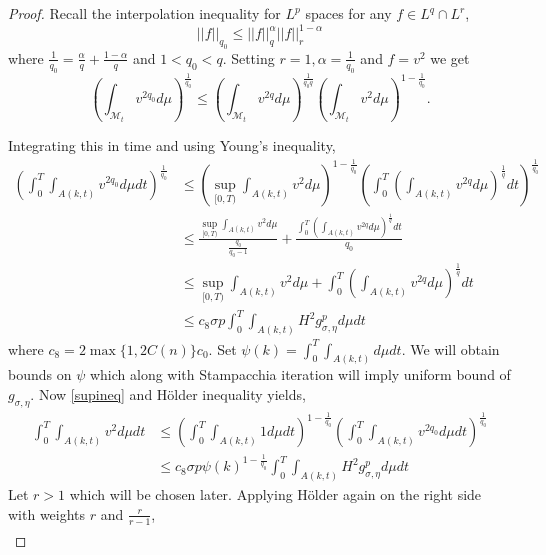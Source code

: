 \begin{proof}
        Recall the interpolation inequality for $ L^{p} $ spaces for any $ f \in L^{q} \cap L^{r} $,
        \[ ||f||_{q_{0}} \le ||f||_{q}^{\alpha}||f||_{r}^{1-\alpha} \]
        where $ \frac{1}{q_{0}} = \frac{\alpha}{q}+ \frac{1-\alpha}{q} $ and $ 1<q_{0}<q $. Setting $ r=1, \alpha = \frac{1}{q_{0}}$ and $ f=v^{2} $ we get \begin{equation}
            \left( \int_{\mathcal{M}_{t}}v^{2q_{0}} d \mu \right)^{\frac{1}{q_{0}}} \le \left( \int_{\mathcal{M}_{t}}v^{2q}d \mu \right)^{\frac{1}{q_{0}q}} \left( \int_{\mathcal{M}_{t}}v^{2}d \mu \right)^{1-\frac{1}{q_{0}}}.
        \end{equation}

        Integrating this in time and using Young's inequality, \begin{align*}
            \left( \int_{0}^{T}\int_{A(k,t)}v^{2q_{0}}d \mu dt \right)^{\frac{1}{q_{0}}} &\le \left( \sup_{[0,T)}\int_{A(k,t)}v^{2}d \mu  \right)^{1-\frac{1}{q_{0}}}\left( \int_{0}^{T}\left( \int_{A(k,t)}v^{2q}d \mu \right)^{\frac{1}{q}} dt\right)^{\frac{1}{q_{0}}} \\
            & \le \frac{ \sup_{[0,T)}\int_{A(k,t)}v^{2}d \mu}{\frac{q_{0}}{q_{0}-1}}+ \frac{\int_{0}^{T}\left( \int_{A(k,t)}v^{2q}d \mu \right)^{\frac{1}{q}} dt}{q_{0}} \\
            & \le  \sup_{[0,T)}\int_{A(k,t)}v^{2}d \mu+ \int_{0}^{T}\left( \int_{A(k,t)}v^{2q}d \mu \right)^{\frac{1}{q}} dt \\
            & \le c_{8} \sigma p \int_{0}^{T}\int_{A(k,t)}H^{2}g_{\sigma,\eta}^{p}d \mu dt
        \end{align*}
        where $ c_{8} =  2\max\{1,2C(n)\}c_{0}$. Set $ \psi(k) = \int_{0}^{T} \int_{A(k,t)}d \mu dt $. We will obtain bounds on $ \psi $ which along with Stampacchia iteration will imply uniform bound of $ g_{\sigma,\eta} $.  Now \cref{supineq} and H\"{o}lder inequality yields, \begin{align}
            \int_{0}^{T}\int_{A(k,t)}v^{2}d \mu dt & \le \left( \int_{0}^{T}\int_{A(k,t)}1 d \mu dt\right)^{1-\frac{1}{q_{0}}} \left( \int_{0}^{T}\int_{A(k,t)}v^{2q_{0}}d \mu dt \right)^{\frac{1}{q_{0}}} \\
            & \le c_{8} \sigma p\psi(k)^{1-\frac{1}{q_{0}}} \int_{0}^{T}\int_{A(k,t)}H^{2}g_{\sigma,\eta}^{p}d \mu dt \label{v2bound}
        \end{align}
        Let $ r>1 $ which will be chosen later. Applying H\"{o}lder again on the right side with weights $ r $ and $ \frac{r}{r-1} $, \begin{align*}

\end{align*}
\end{proof}
